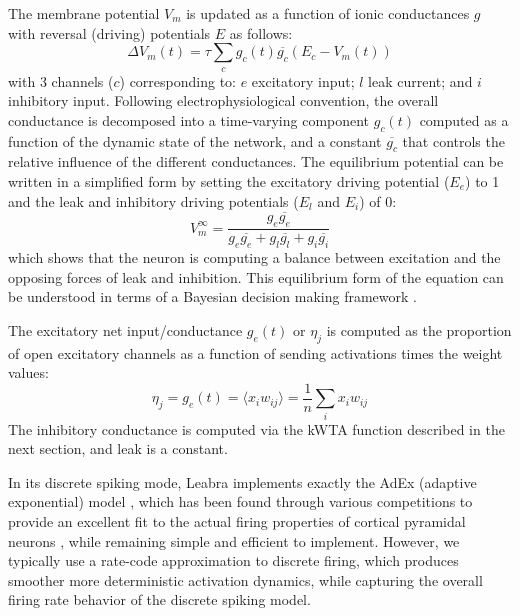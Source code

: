 \documentclass[10pt,letterpaper]{article}
\newcommand{\wij}{w_{ij}}
\newcommand{\oneo}[1]{\frac{1}{#1}}
\numberwithin{equation}{section}
\begin{document}
The membrane potential $V_m$ is updated as a function of ionic
conductances $g$ with reversal (driving) potentials $E$ as follows:
\begin{equation}
 \Delta V_m(t) = \tau \sum_c g_c(t) \overline{g_c} (E_c - V_m(t))
 \label{eq.vm}
\end{equation}
with 3 channels ($c$) corresponding to: $e$ excitatory input; $l$ leak
current; and $i$ inhibitory input. Following electrophysiological
convention, the overall conductance is decomposed into a time-varying
component $g_c(t)$ computed as a function of the dynamic state of the
network, and a constant $\overline{g_c}$ that controls the relative
influence of the different conductances. The equilibrium potential
can be written in a simplified form by setting the excitatory driving
potential ($E_e$) to 1 and the leak and inhibitory driving potentials
($E_l$ and $E_i$) of 0:
\begin{equation}
 V_m^\infty = \frac{g_e \overline{g_e}} {g_e
  \overline{g_e} + g_l \overline{g_l} + g_i \overline{g_i}} 
\end{equation}
which shows that the neuron is computing a balance between excitation
and the opposing forces of leak and inhibition. This equilibrium form
of the equation can be understood in terms of a Bayesian decision
making framework \cite{OReilly:2000}.

The excitatory net input/conductance $g_e(t)$ or $\eta_j$ is computed
as the proportion of open excitatory channels as a function of sending
activations times the weight values:
\begin{equation}
 \eta_j = g_e(t) = \langle x_i \wij \rangle = \oneo{n} \sum_i x_i \wij
 \label{eq.net_in_avg}
\end{equation}
The inhibitory conductance is computed via the kWTA function described
in the next section, and leak is a constant.

In its discrete spiking mode, Leabra implements exactly the AdEx (adaptive
exponential) model \cite{Brette:2005}, which has been found through
various competitions to provide an excellent fit to the actual firing
properties of cortical pyramidal neurons \cite{Gerstner:2009}, while
remaining simple and efficient to implement. However, we typically use a
rate-code approximation to discrete firing, which produces smoother more
deterministic activation dynamics, while capturing the overall firing rate
behavior of the discrete spiking model.
\end{document}
